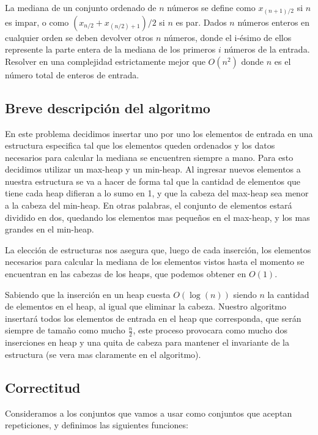 \documentclass{article}
\theoremstyle{definition}
\theoremstyle{remark}
\begin{document}
La mediana de un conjunto ordenado de $n$ números se define como $x_{(n+1)/2}$ si $n$ es impar, o como $(x_{n/2} + x_{(n/2)+1})/2$ si $n$ es par. Dados $n$ números enteros en cualquier orden se deben devolver otros $n$ números, donde el i-ésimo de ellos represente la parte entera de la mediana de los primeros $i$ números de la entrada.
Resolver en una complejidad estrictamente mejor que $O(n^2)$ donde $n$ es el número total de enteros de entrada.

\subsection{Breve descripción del algoritmo}

En este problema decidimos insertar uno por uno los elementos de entrada en una estructura especifica tal que los elementos queden ordenados y los datos necesarios para calcular la mediana se encuentren siempre a mano. Para esto decidimos utilizar un max-heap y un min-heap. Al ingresar nuevos elementos a nuestra estructura se va a hacer de forma tal que la cantidad de elementos que tiene cada heap difieran a lo sumo en 1, y que la cabeza del max-heap sea menor a la cabeza del min-heap. En otras palabras, el conjunto de elementos estará dividido en dos, quedando los elementos mas pequeños en el max-heap, y los mas grandes en el min-heap.

La elección de estructuras nos asegura que, luego de cada inserción, los elementos necesarios para calcular la mediana de los elementos vistos hasta el momento se encuentran en las cabezas de los heaps, que podemos obtener en $O(1)$.

Sabiendo que la inserción en un heap cuesta $O(\log(n))$ siendo $n$ la cantidad de elementos en el heap, al igual que eliminar la cabeza. Nuestro algoritmo insertará todos los elementos de entrada en el heap que corresponda, que serán siempre de tamaño como mucho $\frac{n}{2}$, este proceso provocara como mucho dos inserciones en heap y una quita de cabeza para mantener el invariante de la estructura (se vera mas claramente en el algoritmo).

\subsection{Correctitud}

Consideramos a los conjuntos que vamos a usar como conjuntos que aceptan repeticiones, y definimos las siguientes funciones:

\newcommand{\twopartdef}[4]
{
	\left\{
		\begin{array}{ll}
			#1 & \mbox{if } #2 \\
			#3 & \mbox{if } #4 \\
		\end{array}
	\right.
}
\end{document}
